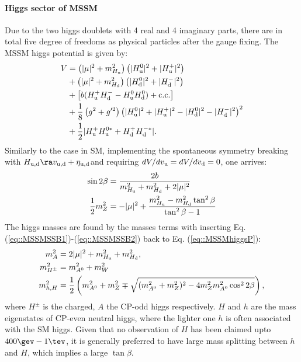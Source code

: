 \paragraph{Higgs sector of MSSM}
Due to the two higgs doublets with 4 real and 4 imaginary parts, 
there are in total five degree of freedoms as physical particles after the gauge fixing.
The MSSM higgs potential is given by:
\begin{align}
V 
& = \left( |\mu|^2 + m^2_{H_{\mathrm{u}}} \right)  \left( |H^0_{\mathrm{u}}|^2+|H^+_{\mathrm{u}}|^2 \right) \nonumber \\
& + \left( |\mu|^2 + m^2_{H_{\mathrm{d}}} \right)  \left( |H^0_{\mathrm{d}}|^2+|H^-_{\mathrm{d}}|^2 \right) \nonumber \\
& + \left[ b (H^+_{\mathrm{u}} H^-_{\mathrm{d}}-H^0_{\mathrm{u}} H^0_{\mathrm{d}}) + \mathrm{c.c.} \right] \nonumber \\
& + \frac{1}{8} \left(g^2+g'^2 \right) \left(   |H^0_{\mathrm{u}}|^2+|H^+_{\mathrm{u}}|^2-|H^0_{\mathrm{d}}|^2-|H^-_{\mathrm{d}}|^2   \right) ^2  \nonumber \\
& + \frac{1}{2} |H^+_{\mathrm{u}} H^{0*}_{\mathrm{u}} + H^+_{\mathrm{d}} H^{-*}_{\mathrm{d}}|. 
\label{eq::MSSMhiggsP}
\end{align}
Similarly to the case in SM, implementing the spontaneous symmetry breaking with $H_{\mup,\mdn} \ra v_{\mup,\mdn} + \eta_{\mup,\mdn}$and requiring $dV/dv_{\mathrm{u}} = dV/dv_{\mathrm{d}} = 0$, one arrives:
\begin{align}
\sin{2\beta} & = \dfrac{2b}{m^2_{H_{\mathrm{u}}} + m^2_{H_{\mathrm{d}}} + 2|\mu|^2 } \label{eq::MSSMSSB1} \\ 
\frac{1}{2} m_Z^2 & = -|\mu|^2 + \dfrac{m^2_{H_{\mathrm{u}}}-m^2_{H_{\mathrm{d}}}\tan^2{\beta}}{\tan^2{\beta}-1} \label{eq::MSSMSSB2}
\end{align}
The higgs masses are found by the masses terms with inserting Eq. (\ref{eq::MSSMSSB1})-(\ref{eq::MSSMSSB2}) back to Eq. (\ref{eq::MSSMhiggsP}):
\begin{align}
m^2_{A} & = 2 |\mu|^2 + m^2_{H_{\mathrm{u}}} + m^2_{H_{\mathrm{d}}}, \nonumber \\
m^2_{H^{\pm}} & = m^2_{A^0} + m^2_W \nonumber \\
m^2_{h,H} & = \dfrac{1}{2} \left( m^2_{A^0} + m_Z^2 \mp \sqrt{(m^2_{A^0} + m^2_Z)^2-4m_Z^2 m^2_{A^0}\cos^2{2\beta}}   \right),
\label{eq::MSSMhiggsMass}
\end{align}
where $H^{\pm}$ is the charged, $A$ the CP-odd higgs respectively. 
$H$ and $h$ are the mass eigenstates of CP-even neutral higgs, where the lighter one $h$ is often associated with the SM higgs. Given that no observation of $H$ has been claimed upto $400\gev-1\tev$, it is generally preferred to have large mass splitting between $h$ and $H$, which implies a large $\tan{\beta}$. \\





